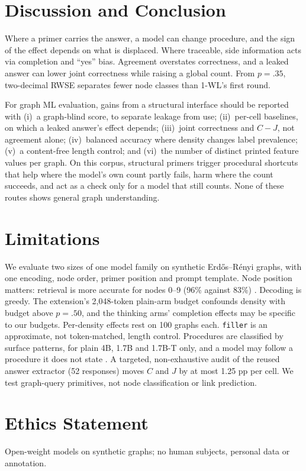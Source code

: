\documentclass[11pt]{article}
\newcommand{\cond}[1]{\texttt{#1}}
\begin{document}
\section{Discussion and Conclusion}

Where a primer carries the answer, a model can change procedure, and the
sign of the effect depends on what is displaced. Where traceable, side
information acts via completion and ``yes'' bias.
Agreement overstates correctness, and a leaked answer can lower joint
correctness while raising a global count. From $p{=}.35$, two-decimal
RWSE separates fewer node classes than 1-WL's first round.

For graph ML evaluation, gains from a structural interface should be reported
with (i)~a graph-blind score, to separate leakage from use; (ii)~per-cell
baselines, on which a leaked answer's effect depends; (iii)~joint correctness and $C{-}J$, not
agreement alone; (iv)~balanced accuracy where density
changes label prevalence; (v)~a content-free length control; and (vi)~the
number of distinct printed feature values per graph. On this corpus,
structural primers trigger procedural shortcuts that help where the model's
own count partly fails, harm where the count succeeds, and act as a check
only for a model that still counts. None of these routes shows general
graph understanding.

\section*{Limitations}

We evaluate two sizes of one model family on synthetic Erd\H{o}s--R\'enyi
graphs, with one encoding, node order, primer position and prompt template.
Node position matters: retrieval is more accurate for nodes 0--9 (96\% against
83\%) \citep{liu2024lostinthemiddle,ge2025graph}. Decoding is greedy. The
extension's 2,048-token plain-arm budget confounds density with budget above
$p{=}.50$, and the thinking arms' completion effects may be specific to our
budgets. Per-density effects rest on 100 graphs each. \cond{filler} is an
approximate, not token-matched, length control. Procedures are classified
by surface patterns, for plain 4B, 1.7B and 1.7B-T only, and a model may
follow a procedure it does not state \citep{turpin2023unfaithful}. A
targeted, non-exhaustive audit of the reused answer extractor (52
responses) moves $C$ and $J$ by at most 1.25 pp per cell. We test
graph-query primitives, not node classification or link prediction.

\section*{Ethics Statement}

Open-weight models on synthetic graphs; no human subjects, personal data or
annotation.



\end{document}
